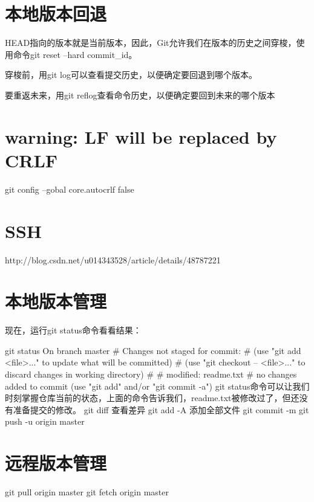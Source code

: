 \chapter{本地版本回退}
HEAD指向的版本就是当前版本，因此，Git允许我们在版本的历史之间穿梭，使用命令git reset --hard commit_id。

穿梭前，用git log可以查看提交历史，以便确定要回退到哪个版本。

要重返未来，用git reflog查看命令历史，以便确定要回到未来的哪个版本
\chapter{warning: LF will be replaced by CRLF}

git config --gobal core.autocrlf false 
\chapter{SSH}

http://blog.csdn.net/u014343528/article/details/48787221

\chapter{本地版本管理}
现在，运行git status命令看看结果：

 git status
 On branch master
# Changes not staged for commit:
#   (use "git add <file>..." to update what will be committed)
#   (use "git checkout -- <file>..." to discard changes in working directory)
#
#    modified:   readme.txt
#
no changes added to commit (use "git add" and/or "git commit -a")
git status命令可以让我们时刻掌握仓库当前的状态，上面的命令告诉我们，readme.txt被修改过了，但还没有准备提交的修改。
git diff 查看差异
git add -A 添加全部文件
git commit -m
git push -u origin master
\chapter{远程版本管理}
git pull origin master
git fetch origin master

